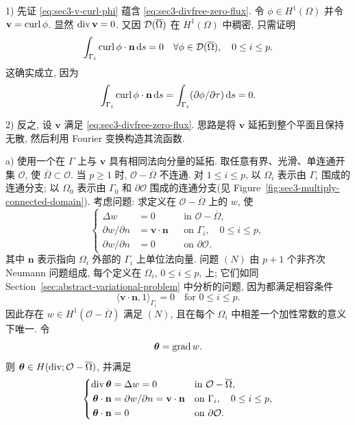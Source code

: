 \begin{Proof}
1) 先证 \eqref{eq:sec3-v-curl-phi} 蕴含 \eqref{eq:sec3-divfree-zero-flux}.
令 $\phi\in H^1(\Omega)$ 并令 $\mathbf v=\operatorname{curl}\phi$. 显然
$\operatorname{div}\mathbf v=0$. 又因 $\mathcal{D}(\overline\Omega)$ 在 $H^1(\Omega)$ 中稠密,
只需证明
\[
  \int_{\Gamma_i}\operatorname{curl}\phi\cdot\mathbf n\,\mathrm{d} s=0
  \quad\forall\phi\in\mathcal{D}(\overline\Omega),\quad0\le i\le p.
\]
这确实成立, 因为
\[
  \int_{\Gamma_i}\operatorname{curl}\phi\cdot\mathbf n\,\mathrm{d} s
  =\int_{\Gamma_i}(\partial\phi/\partial\tau)\,\mathrm{d} s=0.
\]

2) 反之, 设 $\mathbf v$ 满足 \eqref{eq:sec3-divfree-zero-flux}. 思路是将
$\mathbf v$ 延拓到整个平面且保持无散, 然后利用 Fourier 变换构造其流函数.

a) 使用一个在 $\Gamma$ 上与 $\mathbf v$ 具有相同法向分量的延拓.
取任意有界、光滑、单连通开集 $\mathcal O$, 使
$\overline\Omega\subset\mathcal O$. 当 $p\ge1$ 时,
$\mathcal O-\overline\Omega$ 不连通. 对 $1\le i\le p$, 以 $\Omega_i$ 表示由
$\Gamma_i$ 围成的连通分支; 以 $\Omega_0$ 表示由 $\Gamma_0$ 和
$\partial\mathcal O$ 围成的连通分支(见 Figure~\ref{fig:sec3-multiply-connected-domain}).
考虑问题: 求定义在 $\mathcal O-\overline\Omega$ 上的 $w$, 使
\[
\left\{\begin{aligned}
  \Delta w&=0&&\text{in }\mathcal O-\overline\Omega,\\
  \partial w/\partial n&=\mathbf v\cdot\mathbf n&&\text{on }\Gamma_i,
       \quad0\le i\le p,\\
  \partial w/\partial n&=0&&\text{on }\partial\mathcal O.
\end{aligned}\right.
\tag{N}
\]
其中 $\mathbf n$ 表示指向 $\Omega_i$ 外部的 $\Gamma_i$ 上单位法向量.
问题 $(N)$ 由 $p+1$ 个非齐次 Neumann 问题组成, 每个定义在
$\Omega_i$, $0\le i\le p$, 上; 它们如同
Section~\ref{sec:abstract-variational-problem} 中分析的问题, 因为都满足相容条件
\[
  \langle\mathbf v\cdot\mathbf n,1\rangle_{\Gamma_i}=0
  \quad\text{for }0\le i\le p.
\]
因此存在 $w\in H^1(\mathcal O-\overline\Omega)$ 满足 $(N)$, 且在每个
$\Omega_i$ 中相差一个加性常数的意义下唯一. 令
\[
  \boldsymbol\theta=\operatorname{grad} w.
\]
则 $\boldsymbol\theta\in H(\operatorname{div};\mathcal O-\overline\Omega)$, 并满足
\begin{equation}\label{eq:sec3-extension-normal-data}
\left\{\begin{aligned}
  \operatorname{div}\boldsymbol\theta&=\Delta w=0&&\text{in }\mathcal O-\overline\Omega,\\
  \boldsymbol\theta\cdot\mathbf n&=\partial w/\partial n
    =\mathbf v\cdot\mathbf n&&\text{on }\Gamma_i,
      \quad0\le i\le p,\\
  \boldsymbol\theta\cdot\mathbf n&=0&&\text{on }\partial\mathcal O.
\end{aligned}\right.
\end{equation}


\end{Proof}
